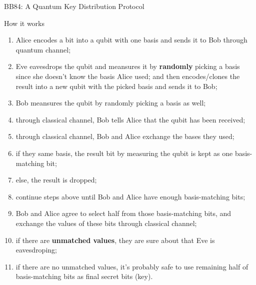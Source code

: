 \documentclass{beamer}
\begin{document}
\begin{frame}{BB84: A Quantum Key Distribution Protocol}
  \begin{block}{How it works}
  {\scriptsize
    \begin{enumerate}[I]
      \item Alice encodes a bit into a qubit with one basis and sends it to Bob through quantum channel;
      \item Eve eavesdrops the qubit and meansures it by \textbf{randomly} picking a basis since she doesn't know the basis Alice used; and then encodes/clones the result into a new qubit with the picked basis and sends it to Bob;
      \item Bob meansures the qubit by randomly picking a basis as well;
      \item through classical channel, Bob tells Alice that the qubit has been received;
      \item through classical channel, Bob and Alice exchange the bases they used;
      \item if they same basis, the result bit by measuring the qubit is kept as one basis-matching bit;
      \item else, the result is dropped;
      \item continue steps above until Bob and Alice have enough basis-matching bits;
      \item Bob and Alice agree to select half from those basis-matching bits, and exchange the values of these bits through classical channel;
      \item if there are \textbf{unmatched values}, they are sure about that Eve is eavesdroping;
      \item if there are no unmatched values, it's probably safe to use remaining half of basis-matching bits as final secret bits (key).
    \end{enumerate}
  }%
  \end{block}
\end{frame}
\end{document}

